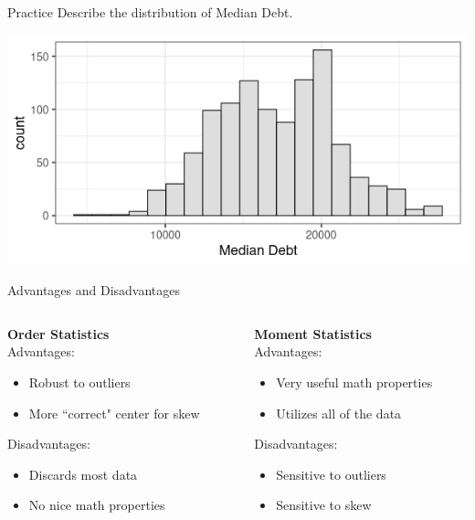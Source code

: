 \documentclass{beamer}
\begin{document}
\begin{frame}{Practice}
Describe the distribution of Median Debt. 
\begin{center}
\includegraphics[scale=0.5]{mult_dist4.png}
\end{center}
\end{frame}



\begin{frame}{Advantages and Disadvantages}
\begin{columns}

  \begin{column}{0.45\textwidth}
\textbf{Order Statistics} \\ \vspace{2mm}
Advantages:
\begin{itemize}
\item[] Robust to outliers 
\item[] More ``correct" center for skew
\end{itemize}
Disadvantages:
\begin{itemize}
\item[] Discards most data
\item[] No nice math properties
\end{itemize}
  \end{column}
  \begin{column}{0.45\textwidth}
\textbf{Moment Statistics} \\ \vspace{2mm} 
Advantages:
\begin{itemize}
\item[] Very useful math properties 
\item[] Utilizes all of the data
\end{itemize}
Disadvantages:
\begin{itemize}
\item[] Sensitive to outliers
\item[] Sensitive to skew
\end{itemize}
  \end{column}

\end{columns}
\end{frame}
\end{document}
